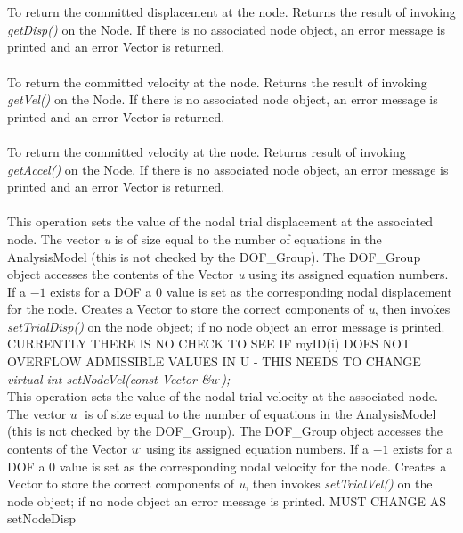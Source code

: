   \\
 \\
To return the committed displacement at the node. Returns the result
of invoking {\em getDisp()} on the Node. If there is no associated
node object, an error message is printed and an error Vector is
returned. \\


 \\
To return the committed velocity at the node. Returns the result of
invoking {\em getVel()} on the Node. If there is no associated node
object, an error message is printed and an error Vector is returned. \\

 \\
To return the committed velocity at the node. Returns result of
invoking  {\em getAccel()} on the Node. If there is no associated node
object, an error message is printed and an error Vector is returned. \\

 \\
This operation sets the value of the nodal trial displacement at the
associated node. The vector {\em u} is of size equal to the number of
equations in the AnalysisModel (this is not checked by the DOF\_Group).
The DOF\_Group object accesses the contents of the Vector {\em u} using
its assigned equation numbers. If a $-1$ exists for a DOF a $0$ value
is set as the corresponding nodal displacement for the node. Creates a Vector
to store the correct components of {\em u}, then invokes {\em setTrialDisp()}
on the node object; if no node object an error message is
printed. CURRENTLY THERE IS NO CHECK TO SEE IF myID(i) DOES NOT OVERFLOW
ADMISSIBLE VALUES IN U - THIS NEEDS TO CHANGE \\


{\em virtual int setNodeVel(const Vector \&$u^{.}$);}\\
This operation sets the value of the nodal trial velocity at the
associated node. The vector {\em $u^{.}$} is of size equal to the number of
equations in the AnalysisModel (this is not checked by the DOF\_Group).
The DOF\_Group object accesses the contents of the Vector {\em $u^{.}$} using
its assigned equation numbers. If a $-1$ exists for a DOF a $0$ value
is set as the corresponding nodal velocity for the node.  Creates a Vector
to store the correct components of {\em u}, then invokes {\em setTrialVel()}
on the node object; if no node object an error message is printed. 
MUST CHANGE AS setNodeDisp \\

